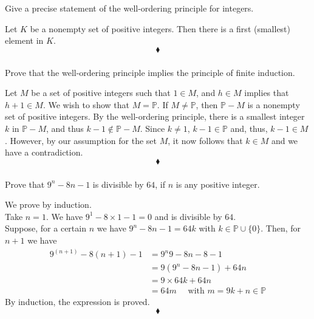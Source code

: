 \subsubsection{}
\begin{tcolorbox}
Give a precise statement of the well-ordering principle for integers. 
\end{tcolorbox}
Let $K$ be a nonempty set of positive integers. Then there is a first (smallest) element in $K$. 
$$\blacklozenge$$

\subsubsection{}
\begin{tcolorbox}
Prove that the well-ordering principle implies the principle of finite induction. 
\end{tcolorbox}
Let $M$ be a set of positive integers such that $1\in M$, and $h\in M$ implies that $h+1\in M$. We wish to show that $M = \mathbb{P}$. If $M \neq \mathbb{P}$, then $\mathbb{P}- M$ is a nonempty set of positive integers. By the well-ordering principle, there is a smallest integer $k$ in $\mathbb{P}-M$,  and thus $k-1\not\in \mathbb{P}-M$. Since $k \neq 1$, $k-1\in \mathbb{P}$ and, thus, $k-1\in M$ . However, by our assumption for the set $M$, it now follows that $k\in M$ and we have a contradiction. 
$$\blacklozenge$$

\subsubsection{}
\begin{tcolorbox}
 Prove that $9^n-8n-1$ is divisible by $64$, if $n$ is any positive integer. 
\end{tcolorbox}
We prove by induction.\\
Take $n=1$. We have $9^1-8\times 1-1=0$ and is divisible by $64$.\\
Suppose, for a certain $n$ we have $9^n-8n-1=64k$ with $k \in \mathbb{P}\cup \{0\}$. Then, for $n+1$ we have 
\begin{align*}
9^{(n+1)}-8(n+1)-1& = 9^n9-8n-8-1\\
& = 9(9^n-8n-1)+64n\\
& = 9\times 64 k+64n\\
&= 64m\quad\text{ with } m=9k+n\in \mathbb{P}
\end{align*}
By induction, the expression is proved.
$$\blacklozenge$$


\renewcommand{\thesubsection}{\thesection.\RomanNumeralCaps{8}}
